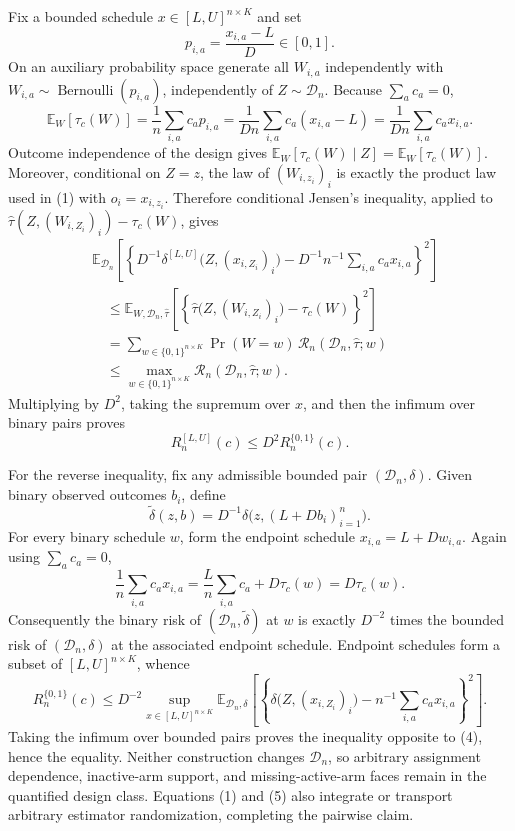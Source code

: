 Fix a bounded schedule \(x\in[L,U]^{n\times K}\) and set
\[
p_{i,a}=\frac{x_{i,a}-L}{D}\in[0,1].
\]
On an auxiliary probability space generate all \(W_{i,a}\) independently with \(W_{i,a}\sim\operatorname{Bernoulli}(p_{i,a})\), independently of \(Z\sim\mathcal D_n\).  Because \(\sum_a c_a=0\),
\[
\mathbb E_W\!\left[\tau_c(W)\right]
=\frac1n\sum_{i,a}c_ap_{i,a}
=\frac{1}{D n}\sum_{i,a}c_a(x_{i,a}-L)
=\frac{1}{D n}\sum_{i,a}c_ax_{i,a}.
\tag{2}
\]
Outcome independence of the design gives \(\mathbb E_W[\tau_c(W)\mid Z]=\mathbb E_W[\tau_c(W)]\).  Moreover, conditional on \(Z=z\), the law of \((W_{i,z_i})_i\) is exactly the product law used in (1) with \(o_i=x_{i,z_i}\).  Therefore conditional Jensen's inequality, applied to
\(\widehat\tau(Z,(W_{i,Z_i})_i)-\tau_c(W)\), gives
\[
\begin{aligned}
&\mathbb E_{\mathcal D_n}
\left[
\left\{
D^{-1}\delta^{[L,U]}\bigl(Z,(x_{i,Z_i})_i\bigr)
-D^{-1}n^{-1}\sum_{i,a}c_ax_{i,a}
\right\}^{2}
\right]\\
&\quad\le
\mathbb E_{W,\mathcal D_n,\widehat\tau}
\left[
\left\{
\widehat\tau\bigl(Z,(W_{i,Z_i})_i\bigr)-\tau_c(W)
\right\}^{2}
\right]\\
&\quad=
\sum_{w\in\{0,1\}^{n\times K}}
\Pr(W=w)\,
\mathcal R_n(\mathcal D_n,\widehat\tau;w)\\
&\quad\le
\max_{w\in\{0,1\}^{n\times K}}
\mathcal R_n(\mathcal D_n,\widehat\tau;w).
\end{aligned}
\tag{3}
\]
Multiplying by \(D^2\), taking the supremum over \(x\), and then the infimum over binary pairs proves
\[
R_n^{[L,U]}(c)\le D^2R_n^{\{0,1\}}(c).
\tag{4}
\]

For the reverse inequality, fix any admissible bounded pair \((\mathcal D_n,\delta)\).  Given binary observed outcomes \(b_i\), define
\[
\widetilde\delta(z,b)=D^{-1}\delta\bigl(z,(L+Db_i)_{i=1}^n\bigr).
\tag{5}
\]
For every binary schedule \(w\), form the endpoint schedule \(x_{i,a}=L+Dw_{i,a}\).  Again using \(\sum_a c_a=0\),
\[
\frac1n\sum_{i,a}c_ax_{i,a}
=\frac{L}{n}\sum_{i,a}c_a+D\tau_c(w)
=D\tau_c(w).
\tag{6}
\]
Consequently the binary risk of \((\mathcal D_n,\widetilde\delta)\) at \(w\) is exactly \(D^{-2}\) times the bounded risk of \((\mathcal D_n,\delta)\) at the associated endpoint schedule.  Endpoint schedules form a subset of \([L,U]^{n\times K}\), whence
\[
R_n^{\{0,1\}}(c)
\le D^{-2}
\sup_{x\in[L,U]^{n\times K}}
\mathbb E_{\mathcal D_n,\delta}
\left[
\left\{
\delta\bigl(Z,(x_{i,Z_i})_i\bigr)
-n^{-1}\sum_{i,a}c_ax_{i,a}
\right\}^{2}
\right].
\tag{7}
\]
Taking the infimum over bounded pairs proves the inequality opposite to (4), hence the equality.  Neither construction changes \(\mathcal D_n\), so arbitrary assignment dependence, inactive-arm support, and missing-active-arm faces remain in the quantified design class.  Equations (1) and (5) also integrate or transport arbitrary estimator randomization, completing the pairwise claim.

